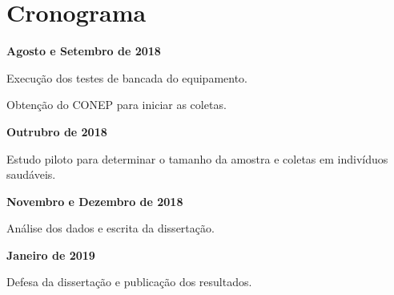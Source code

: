 \section{Cronograma}

\textbf{Agosto e Setembro de 2018}

Execução dos testes de bancada do equipamento.

Obtenção do CONEP  para iniciar as coletas.

\textbf{Outrubro de 2018}

Estudo piloto para determinar o tamanho da amostra e coletas em indivíduos saudáveis.

\textbf{Novembro e Dezembro de 2018}

Análise dos dados e escrita da dissertação.

\textbf{Janeiro de 2019}

Defesa da dissertação e publicação dos resultados.